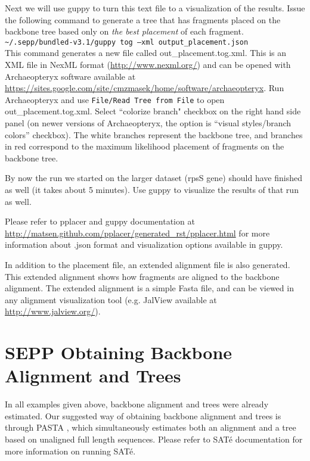 \documentclass[11pt]{article} %
\newcommand{\sepp}{SEPP\xspace}
\newcommand{\ins}[1]{{\tt #1}}
\newcommand{\file}[1]{{\sf #1}}
\newcommand{\sate}{SAT\'{e}\xspace}
\newcommand{\pplacer}{pplacer\xspace}
\newcommand{\guppy}{guppy\xspace}
\newcommand{\arch}{Archaeopteryx\xspace}
\newcommand{\sbun}{\textasciitilde/.sepp/bundled-v3.1}
\begin{document}
Next we will use \guppy to turn this text file to a visualization of the results. Issue the following command to generate a tree that has fragments placed on the backbone tree based only on {\em the best placement} of each fragment.\\

\ins{\sbun/guppy tog --xml output\_placement.json}\\

This command generates a new file called \file{out\_placement.tog.xml}. This is an XML file in NexML format (\url{http://www.nexml.org/}) and can be opened with \arch software {available at \url{https://sites.google.com/site/cmzmasek/home/software/archaeopteryx}}. 
Run \arch and use \ins{File/Read Tree from File} to open \file{out\_placement.tog.xml}. Select ``colorize branch" checkbox on the right hand side panel (on newer versions of \arch, the option is ``visual styles/branch colors'' checkbox). The white branches represent the backbone tree, and branches in red correspond to the maximum likelihood placement of fragments on the backbone tree. 

By now the run we started on the larger dataset (rpsS gene) should have finished as well (it takes about 5 minutes). Use \guppy to visualize the results of that run as well. 

Please refer to \pplacer and \guppy documentation at \url{http://matsen.github.com/pplacer/generated_rst/pplacer.html} for more information about \file{.json} format and visualization options available in \guppy. 

In addition to the placement file, an extended alignment file is also generated. This extended alignment shows how fragments are aligned to the backbone alignment. The extended alignment is a simple Fasta file, and can be viewed in any alignment visualization tool (e.g. JalView available at \url{http://www.jalview.org/}). 


\section{\sepp Obtaining Backbone Alignment and Trees}\label{sec:backbone}
In all examples given above, backbone alignment and trees were already estimated.
Our suggested way of obtaining backbone alignment and trees is through PASTA \cite{pasta-jcb},
which simultaneously estimates both an alignment and a tree based on unaligned full length sequences.
Please refer to \sate documentation for more information on running \sate. 
\end{document}
